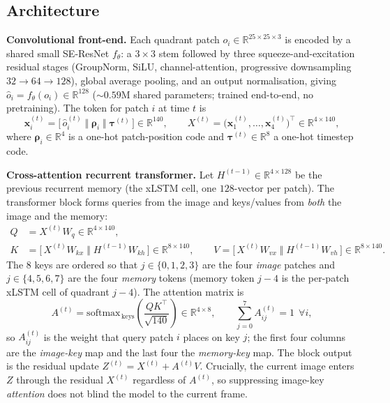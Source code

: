 \documentclass[11pt]{article}
\newcommand{\Rd}{\mathbb{R}}
\begin{document}
\subsection{Architecture}
\textbf{Convolutional front-end.} Each quadrant patch $o_i\in\Rd^{25\times25\times3}$ is encoded by a
shared small SE-ResNet $f_\theta$: a $3\times3$ stem followed by three squeeze-and-excitation residual
stages (GroupNorm, SiLU, channel-attention, progressive downsampling $32\!\to\!64\!\to\!128$), global
average pooling, and an output normalisation, giving $\hat o_i = f_\theta(o_i)\in\Rd^{128}$
($\sim\!0.59$M shared parameters; trained end-to-end, no pretraining). The token for patch $i$ at time
$t$ is
\begin{equation}
\bm{x}_i^{(t)} = \big[\,\hat o_i^{(t)} \;\Vert\; \bm{\rho}_i \;\Vert\; \bm{\tau}^{(t)}\,\big]\in\Rd^{140},
\qquad X^{(t)}=\big(\bm x_1^{(t)},\dots,\bm x_4^{(t)}\big)^{\!\top}\in\Rd^{4\times140},
\end{equation}
where $\bm\rho_i\in\Rd^4$ is a one-hot patch-position code and $\bm\tau^{(t)}\in\Rd^8$ a one-hot
timestep code.

\textbf{Cross-attention recurrent transformer.} Let $H^{(t-1)}\in\Rd^{4\times128}$ be the previous
recurrent memory (the xLSTM cell, one $128$-vector per patch). The transformer block forms queries from
the image and keys/values from \emph{both} the image and the memory:
\begin{align}
Q &= X^{(t)}W_q \in\Rd^{4\times140}, \\
K &= \big[\,X^{(t)}W_{kx}\;\Vert\;H^{(t-1)}W_{kh}\,\big]\in\Rd^{8\times140}, \qquad
V = \big[\,X^{(t)}W_{vx}\;\Vert\;H^{(t-1)}W_{vh}\,\big]\in\Rd^{8\times140}.
\end{align}
The $8$ keys are ordered so that $j\in\{0,1,2,3\}$ are the four \emph{image} patches and
$j\in\{4,5,6,7\}$ are the four \emph{memory} tokens (memory token $j{-}4$ is the per-patch xLSTM cell of
quadrant $j{-}4$). The attention matrix is
\begin{equation}
\boxed{\;A^{(t)} = \mathrm{softmax}_{\,\mathrm{keys}}\!\left(\frac{Q K^{\top}}{\sqrt{140}}\right)\in\Rd^{4\times8},
\qquad \sum_{j=0}^{7} A^{(t)}_{ij}=1\ \ \forall i,\;}
\label{eq:attn}
\end{equation}
so $A^{(t)}_{ij}$ is the weight that query patch $i$ places on key $j$; the first four columns are the
\emph{image-key} map and the last four the \emph{memory-key} map. The block output is the
residual update $Z^{(t)} = X^{(t)} + A^{(t)}V$. Crucially, the current image enters $Z$ through the
residual $X^{(t)}$ regardless of $A^{(t)}$, so suppressing image-key \emph{attention} does not blind the
model to the current frame.
\end{document}
